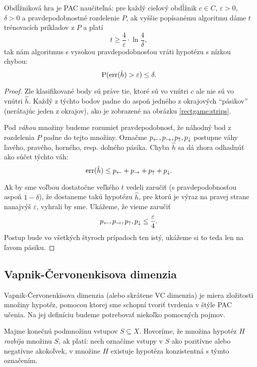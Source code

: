 \begin{theorem}
  Obdĺžniková hra je PAC naučiteľná: pre každý cieľový obdĺžnik $c \in C$,
  $\varepsilon > 0$, $\delta > 0$ a pravdepodobnostné rozdelenie $P$, ak
  vyššie popísanému algoritmu dáme $t$ trénovacích príkladov z $P$ a
  platí
  $$ t \geq \frac{4}{\varepsilon} \cdot \ln{\frac{4}{\delta}}, $$
  tak nám algoritmus s vysokou pravdepodobnosťou vráti hypotézu s nízkou
  chybou:
  $$ \operatorname*{\mathrm{P}}(\mathrm{err}(\hat{h}) > \varepsilon) \leq \delta. $$
\end{theorem}
\begin{proof}
  Zle klasifikované body sú práve tie, ktoré sú vo vnútri $c$ ale nie sú
  vo vnútri $\hat{h}$. Každý z týchto bodov padne do aspoň jedného
  z okrajových ``pásikov'' (nerátajúc jeden z okrajov), ako je
  zobrazené na obrázku \ref{rectgame:strips}.
  
  Pod \emph{váhou} množiny budeme rozumieť pravdepodobnosť, že náhodný
  bod z rozdelenia $P$ padne do tejto množiny.
  Označme $p_\leftarrow, p_\rightarrow, p_\uparrow, p_\downarrow$ postupne váhy ľavého,
  pravého, horného, resp. dolného pásika. Chyba $\hat{h}$ sa dá zhora
  odhadnúť ako súčet týchto váh:
  $$ \mathrm{err}(\hat{h}) \leq p_\leftarrow + p_\rightarrow + p_\uparrow + p_\downarrow. $$
  
  Ak by sme voľbou dostatočne veľkého $t$ vedeli zaručiť
  (s pravdepodobnosťou aspoň $1 - \delta$), že dostaneme takú hypotézu
  $\hat{h}$, pre ktorú je výraz na pravej strane nanajvýš $\varepsilon$,
  vyhrali by sme. Ukážeme, že vieme zaručiť
  $$ p_\leftarrow, p_\rightarrow, p_\uparrow, p_\downarrow \leq \frac{\varepsilon}{4}. $$
  Postup bude vo všetkých štyroch prípadoch ten istý, ukážeme si to
  teda len na ľavom pásiku.
  
\end{proof}




\subsection{Vapnik-Červonenkisova dimenzia}

Vapnik-Červonenkisova dimenzia (alebo skrátene VC dimenzia) je miera
zložitosti množiny hypotéz, pomocou ktorej sme schopní tvoriť tvrdenia
v štýle PAC učenia. Na jej definíciu budeme potrebovať niekoľko pomocných
pojmov.

\begin{definition}
  Majme konečnú podmnožinu vstupov $S \subseteq X$. Hovoríme, že množina
  hypotéz $H$ \emph{rozbíja} množinu $S$, ak platí: nech označíme vstupy
  v $S$ ako pozitívne alebo negatívne akokoľvek, v množine $H$ existuje
  hypotéza konzistentná s týmto označením.
\end{definition}


